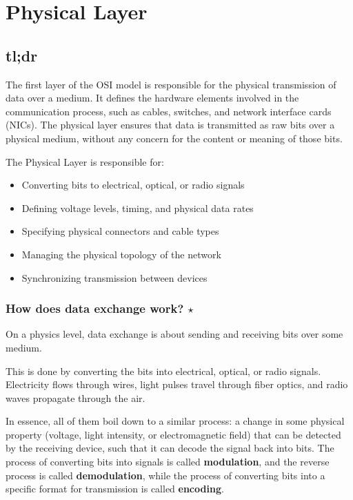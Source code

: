 \chapter{Physical Layer}\label{sec:osi_physical}
\section{tl;dr}
The first layer of the OSI model is responsible for the physical transmission of data over a medium. It defines the hardware elements involved in the communication process, such as cables, switches, and network interface cards (NICs). The physical layer ensures that data is transmitted as raw bits over a physical medium, without any concern for the content or meaning of those bits.

The Physical Layer is responsible for:
\begin{itemize}
    \item Converting bits to electrical, optical, or radio signals
    \item Defining voltage levels, timing, and physical data rates
    \item Specifying physical connectors and cable types
    \item Managing the physical topology of the network
    \item Synchronizing transmission between devices
\end{itemize}


\subsection*{How does data exchange work? $\star$}
On a physics level, data exchange is about sending and receiving bits over some medium. 

This is done by converting the bits into electrical, optical, or radio signals. Electricity flows through wires, light pulses travel through fiber optics, and radio waves propagate through the air.


In essence, all of them boil down to a similar process: a change in some physical property (voltage, light intensity, or electromagnetic field) that can be detected by the receiving device, such that it can decode the signal back into bits. The process of converting bits into signals is called \textbf{modulation}, and the reverse process is called \textbf{demodulation}, while the process of converting bits into a specific format for transmission is called \textbf{encoding}.

